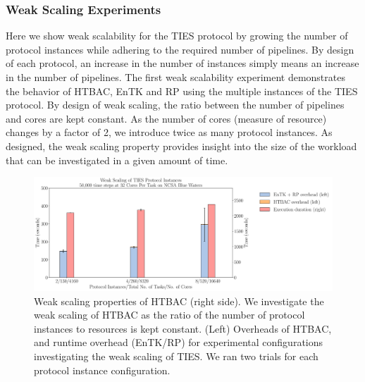 


\subsubsection{Weak Scaling Experiments}

Here we show weak scalability for the TIES protocol by growing the number of
protocol instances while adhering to the required number of pipelines. By
design of each protocol, an increase in the number of instances simply means
an increase in the number of pipelines. The first weak scalability experiment
demonstrates the behavior of HTBAC, EnTK and RP using the multiple instances
of the TIES protocol. By design of weak scaling, the ratio between the number
of pipelines and cores are kept constant. As the number of cores (measure of
resource) changes by a factor of 2, we introduce twice as many protocol
instances. As designed, the weak scaling property provides insight into the
size of the workload that can be investigated in a given amount of time.

\begin{figure}
  \centering
   \includegraphics[width=\columnwidth]{./figures/weak_scaling_TIES_instances_50,000_timesteps.pdf}
  \caption{Weak scaling properties of HTBAC (right side). We investigate the
  weak scaling of HTBAC as the ratio of the number of protocol instances to
  resources is kept constant. (Left) Overheads of HTBAC, and runtime overhead (EnTK/RP) for
  experimental configurations investigating the weak scaling of TIES. We ran two trials for each protocol instance configuration.}
\label{fig:weak_scaling}
\end{figure}


